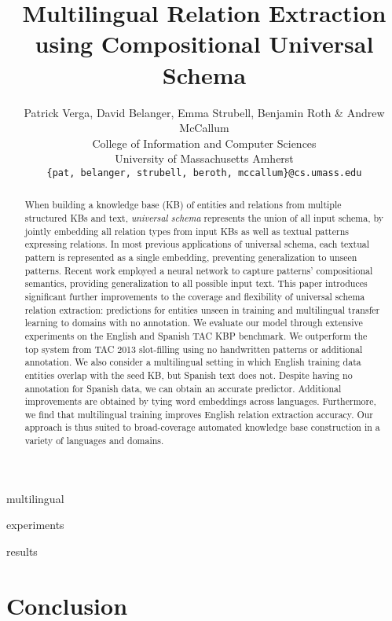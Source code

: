 \documentclass{article} %
\title{Multilingual Relation Extraction using Compositional Universal Schema}
\author{Patrick Verga, David Belanger, Emma Strubell, Benjamin Roth \& Andrew McCallum \\
College of Information and Computer Sciences\\
University of Massachusetts Amherst\\
\texttt{\{pat, belanger, strubell, beroth, mccallum\}@cs.umass.edu} \\
}
\begin{document}
\maketitle

\begin{abstract}
When building a knowledge base (KB) of entities and relations from multiple structured KBs and text, \emph{universal schema} represents the union of all input schema, by jointly embedding all relation types from input KBs as well as textual patterns expressing relations.  
In most previous applications of universal schema, each textual pattern is represented as a single embedding, preventing generalization to unseen patterns. 
Recent work employed a neural network to capture patterns' compositional semantics, providing generalization to all possible input text. 
This paper introduces significant further improvements to the coverage and flexibility of universal schema relation extraction: predictions for entities unseen in training and multilingual transfer learning to domains with no annotation. 
We evaluate our model through extensive experiments on the English and Spanish TAC KBP benchmark.
We outperform the top system from TAC 2013 slot-filling using no handwritten patterns or additional annotation. 
We also consider a multilingual setting in which English training data entities overlap with the seed KB, but Spanish text does not. 
Despite having no annotation for Spanish data, we can obtain an accurate predictor. 
Additional improvements are obtained by tying word embeddings across languages. 
Furthermore, we find that multilingual training improves English relation extraction accuracy. 
Our approach is thus suited to broad-coverage automated knowledge base construction in a variety of languages and domains.
\end{abstract}







 {multilingual}

 {experiments}

 {results}
\section{Conclusion}
\end{document}
